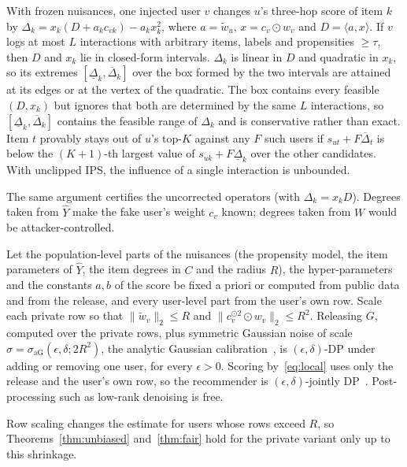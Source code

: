 \begin{theorem}\label{thm:robust}
With frozen nuisances, one injected user $v$ changes $u$'s three-hop score of item
$k$ by $\Delta_k=x_k(D+a_kc_{vk})-a_kx_k^2$, where $a=\tilde w_u$, $x=c_v\odot w_v$
and $D=\langle a,x\rangle$. If $v$ logs at most $L$ interactions with arbitrary
items, labels and propensities $\ge\tau$, then $D$ and $x_k$ lie in closed-form
intervals. $\Delta_k$ is linear in $D$ and quadratic in $x_k$, so its extremes
$[\underline\Delta_k,\overline\Delta_k]$ over the box formed by the two intervals
are attained at its edges or at the vertex of the quadratic. The box contains
every feasible $(D,x_k)$ but ignores that both are determined by the same $L$
interactions, so $[\underline\Delta_k,\overline\Delta_k]$ contains the feasible
range of $\Delta_k$ and is conservative rather than exact. Item $t$
provably stays out of $u$'s top-$K$ against any $F$ such users if
$s_{ut}+F\overline\Delta_t$ is below the $(K{+}1)$-th largest value of
$s_{uk}+F\underline\Delta_k$ over the other candidates. With unclipped IPS, the
influence of a single interaction is unbounded.
\end{theorem}
The same argument certifies the uncorrected operators (with
$\Delta_k=x_kD$). Degrees taken from $\hat Y$ make the fake user's weight $c_v$
known; degrees taken from $W$ would be attacker-controlled.

\begin{theorem}\label{thm:dp}
Let the population-level parts of the nuisances (the propensity model, the
item parameters of $\hat Y$, the item degrees in $C$ and the radius $R$), the
hyper-parameters and the constants $a,b$ of the score be fixed a priori or
computed from public data and from the release, and every user-level part
from the user's own row.
Scale each private row so that $\|\tilde w_v\|_2\le R$ and
$\|c_v^{\odot2}\odot w_v\|_2\le R^2$. Releasing $G$, computed over the private
rows, plus symmetric Gaussian noise of scale
$\sigma=\sigma_{\mathrm{aG}}(\epsilon,\delta;2R^2)$, the analytic Gaussian
calibration~\cite{balle2018analytic}, is $(\epsilon,\delta)$-DP under adding or
removing one user, for every $\epsilon>0$. Scoring by~\eqref{eq:local} uses only
the release and the user's own row, so the recommender is $(\epsilon,\delta)$-jointly
DP~\cite{hsu2014matchings}. Post-processing such as low-rank denoising is free.
\end{theorem}
Row scaling changes the estimate for users whose rows exceed $R$, so
Theorems~\ref{thm:unbiased} and~\ref{thm:fair} hold for the private variant only
up to this shrinkage.

